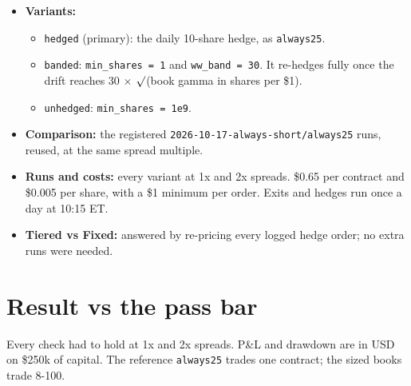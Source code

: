 \documentclass{article}
\begin{document}
\begin{itemize}
\begin{itemize}

\item The scenario prices the put at spot \ensuremath{-}20\% and IV = max(60\%, its IV), using Black-Scholes.

\item The hedge offsets the put's delta. The shares a hedge band can leave open count as unhedged.

\end{itemize}

\item \textbf{Variants:}

\begin{itemize}

\item \texttt{hedged} (primary): the daily 10-share hedge, as \texttt{always25}.

\item \texttt{banded}: \texttt{min\_\allowbreak{}shares = 1} and \texttt{ww\_\allowbreak{}band = 30}. It re-hedges fully once the drift reaches 30 \ensuremath{\times} \ensuremath{\surd}(book gamma in shares per \$1).

\item \texttt{unhedged}: \texttt{min\_\allowbreak{}shares = 1e9}.

\end{itemize}

\item \textbf{Comparison:} the registered \texttt{2026-\allowbreak{}10-\allowbreak{}17-\allowbreak{}always-\allowbreak{}short/\allowbreak{}always25} runs, reused, at the same spread multiple.

\item \textbf{Runs and costs:} every variant at 1x and 2x spreads. \$0.65 per contract and \$0.005 per share, with a \$1 minimum per order. Exits and hedges run once a day at 10:15 ET.

\item \textbf{Tiered vs Fixed:} answered by re-pricing every logged hedge order; no extra runs were needed.

\end{itemize}

\section{Result vs the pass bar}

Every check had to hold at 1x and 2x spreads. P\&L and drawdown are in USD on \$250k of capital. The reference \texttt{always25} trades one contract; the sized books trade 8-100.
\end{document}
